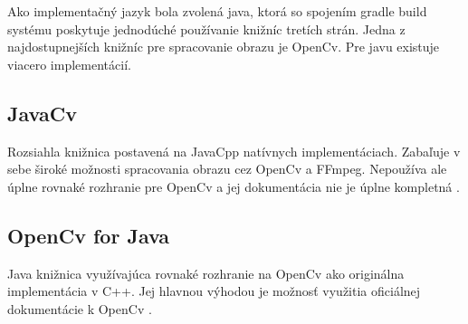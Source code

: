 Ako implementačný jazyk bola zvolená java, ktorá so spojením gradle build systému poskytuje jednodúché používanie knižníc tretích strán. Jedna z najdostupnejších knižníc pre spracovanie obrazu je OpenCv. Pre javu existuje viacero implementácií.

\subsection{JavaCv}

Rozsiahla knižnica postavená na JavaCpp natívnych implementáciach.  Zabaľuje v sebe široké možnosti spracovania obrazu cez OpenCv a FFmpeg. Nepoužíva ale úplne rovnaké rozhranie pre OpenCv a jej dokumentácia nie je úplne kompletná \cite{bytedeco42:online}.

\subsection{OpenCv for Java}

Java knižnica využívajúca rovnaké rozhranie na OpenCv ako originálna implementácia v C++.  Jej hlavnou výhodou je  možnosť využitia oficiálnej dokumentácie k OpenCv \cite{openpnpo16:online}.